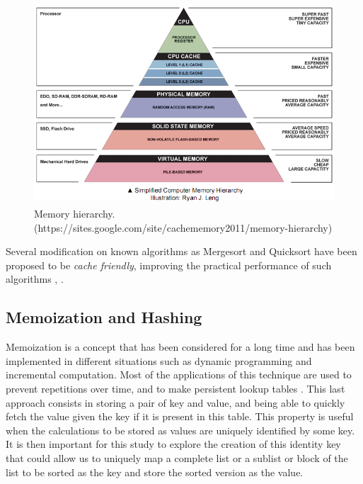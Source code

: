 \documentclass[a4paper,12pt]{article}
\begin{document}
\begin{figure}[H]
\centering
\includegraphics[height=7.5cm,keepaspectratio]{./images/ComputerMemoryHierarchy.png}
\caption{Memory hierarchy. (https://sites.google.com/site/cachememory2011/memory-hierarchy)}
\label{fig:Memory}
\end{figure}

Several modification on known algorithms as Mergesort and Quicksort have been proposed to be {\it cache friendly}, improving the practical performance of such algorithms \cite{lamarca1999influence},  \cite{xiao2000improving}.


\subsection{Memoization and Hashing} \label{memoHash}

Memoization is a concept that has been considered for a long time and has been implemented in different situations \cite{acar2003selective} such as dynamic programming and incremental computation. Most of the applications of this technique are used to prevent repetitions over time, and to make persistent lookup tables \cite{hall1997improving}. This last approach consists in storing a pair of key and value, and being able to quickly fetch the value given the key if it is present in this table. This property is useful when the calculations to be stored as values are uniquely identified by some key. \\

It is then important for this study to explore the creation of this identity key that could allow us to uniquely map a complete list or a sublist or block of the list to be sorted as the key and store the sorted version as the value. \\
\end{document}
